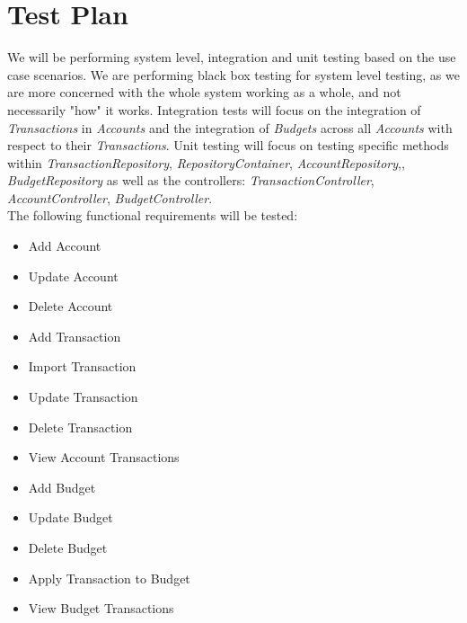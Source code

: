 \documentclass[12pt]{article}
\begin{document}
\section{Test Plan}

We will be performing system level, integration and unit testing based on the use case scenarios.  We are performing black box testing for system level testing, as we are more concerned with the whole system working as a whole, and not necessarily "how" it works. Integration tests will focus on the integration of {\it Transactions} in {\it Accounts} and the integration of {\it Budgets} across all {\it Accounts} with respect to their {\it Transactions}. Unit testing will focus on testing specific methods within {\it TransactionRepository}, {\it RepositoryContainer}, {\it AccountRepository},, {\it BudgetRepository} as well as the controllers: {\it TransactionController}, {\it AccountController}, {\it BudgetController}. \\

The following functional requirements will be tested:
\begin{itemize}
\setlength{\parskip}{0.8mm}
	\item Add Account
	\item Update Account
	\item Delete Account
	\item Add Transaction
	\item Import Transaction
	\item Update Transaction
	\item Delete Transaction
	\item View Account Transactions
	\item Add Budget
	\item Update Budget
	\item Delete Budget
	\item Apply Transaction to Budget
	\item View Budget Transactions
\end{itemize}
\clearpage
\end{document}
